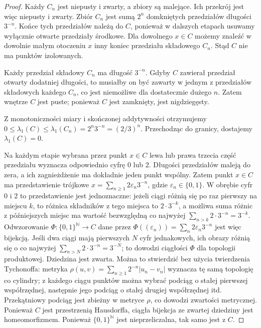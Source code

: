\begin{proof}
Każdy $C_n$ jest niepusty i zwarty, a zbiory są
malejące. Ich przekrój jest więc niepusty i zwarty.
Zbiór $C_n$ jest sumą $2^n$ domkniętych przedziałów
długości $3^{-n}$. Końce tych przedziałów należą do
$C$, ponieważ w dalszych etapach usuwamy wyłącznie
otwarte przedziały środkowe. Dla dowolnego $x\in C$
możemy znaleźć w dowolnie małym otoczeniu $x$
inny koniec przedziału składowego $C_n$.
Stąd $C$ nie ma punktów izolowanych.

Każdy przedział składowy $C_n$ ma długość $3^{-n}$.
Gdyby $C$ zawierał przedział otwarty dodatniej długości,
to musiałby on być zawarty w jednym z przedziałów
składowych każdego $C_n$, co jest niemożliwe dla
dostatecznie dużego $n$. Zatem wnętrze $C$ jest puste;
ponieważ $C$ jest zamknięty, jest nigdziegęsty.

Z monotoniczności miary i skończonej addytywności
otrzymujemy
$0\le\lambda_1(C)\le\lambda_1(C_n)=2^n3^{-n}=(2/3)^n$.
Przechodząc do granicy, dostajemy $\lambda_1(C)=0$.

Na każdym etapie wybrana przez punkt $x\in C$ lewa lub prawa
trzecia część przedziału wyznacza odpowiednio cyfrę $0$ lub $2$.
Długości przedziałów maleją do zera, a ich zagnieżdżenie
ma dokładnie jeden punkt wspólny. Zatem punkt $x\in C$
ma przedstawienie trójkowe
$x=\sum_{n\ge1}2\varepsilon_n3^{-n}$, gdzie
$\varepsilon_n\in\{0,1\}$. W obrębie cyfr $0$ i $2$
to przedstawienie jest jednoznaczne: jeżeli ciągi
różnią się po raz pierwszy na miejscu $k$, to różnica
składników z tego miejsca to $2\cdot3^{-k}$,
a możliwa suma różnic z późniejszych miejsc ma wartość
bezwzględną co najwyżej
$\sum_{n>k}2\cdot3^{-n}=3^{-k}$.
Odwzorowanie
$\Phi:\{0,1\}^{\mathbb N}\to C$ dane przez
$\Phi((\varepsilon_n))=\sum_n2\varepsilon_n3^{-n}$
jest więc bijekcją. Jeśli dwa ciągi mają pierwszych
$N$ cyfr jednakowych, ich obrazy różnią się o co
najwyżej $\sum_{n>N}2\cdot3^{-n}=3^{-N}$;
to dowodzi ciągłości $\Phi$ dla topologii produktowej.
Dziedzina jest zwarta. Można to stwierdzić bez użycia
twierdzenia Tychonoffa: metryka
$\rho(u,v)=\sum_{n\ge1}2^{-n}|u_n-v_n|$
wyznacza tę samą topologię co cylindry; z każdego ciągu
punktów można wybrać podciąg o stałej pierwszej
współrzędnej, następnie jego podciąg o stałej drugiej
współrzędnej itd. Przekątniowy podciąg jest zbieżny
w metryce $\rho$, co dowodzi zwartości metrycznej.
Ponieważ $C$ jest przestrzenią Hausdorffa,
ciągła bijekcja ze zwartej dziedziny jest homeomorfizmem.
Ponieważ $\{0,1\}^{\mathbb N}$ jest nieprzeliczalna,
tak samo jest z $C$.
\end{proof}

